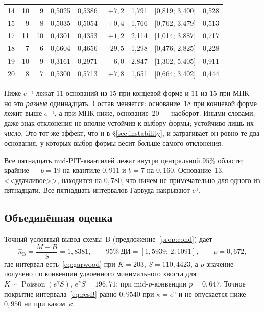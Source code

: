 \documentclass[11pt,a4paper]{article}
\theoremstyle{plain}
\theoremstyle{remark}
\newcommand{\eg}{e^{\gamma}}
\newcommand{\emg}{e^{-\gamma}}
\DeclareMathOperator{\Pois}{Poisson}
\begin{document}
\begin{table}[t]
\begin{tabular}{rrrrrrrl r}
14 & 10 & 9 & 0{,}5025 & 0{,}5386 & $+7{,}2$ & 1{,}791 & [0{,}819; 3{,}400] & 0{,}528\\
15 & 9 & 8 & 0{,}5035 & 0{,}5054 & $+0{,}4$ & 1{,}766 & [0{,}762; 3{,}479] & 0{,}513\\
17 & 11 & 10 & 0{,}4301 & 0{,}4353 & $+1{,}2$ & 2{,}114 & [1{,}014; 3{,}887] & 0{,}717\\
18 & 7 & 6 & 0{,}6604 & 0{,}4656 & $-29{,}5$ & 1{,}298 & [0{,}476; 2{,}825] & 0{,}228\\
19 & 10 & 9 & 0{,}3161 & 0{,}2971 & $-6{,}0$ & 2{,}847 & [1{,}302; 5{,}405] & 0{,}911\\
20 & 8 & 7 & 0{,}5300 & 0{,}5713 & $+7{,}8$ & 1{,}651 & [0{,}664; 3{,}402] & 0{,}444\\
\bottomrule
\end{tabular}
\end{table}

Ниже $\emg$ лежат $11$ оснований из $15$ при концевой форме и $11$ из $15$ при
МНК --- но это \emph{разные} одиннадцать. Состав меняется: основание~18 при
концевой форме лежит выше $\emg$, а при МНК ниже, основание~20 --- наоборот.
Иными словами, даже знак отклонения не вполне устойчив к выбору формы; устойчиво
лишь их \emph{число}. Это тот же эффект, что и в \S\ref{sec:instability}, и
затрагивает он ровно те два основания, у которых выбор формы весит больше самого
отклонения.

Все пятнадцать mid-PIT-квантилей лежат внутри центральной $95\%$ области; крайние ---
$b=19$ на квантиле $0{,}911$ и $b=7$ на $0{,}160$. Основание~13, <<удачливое>>,
находится на $0{,}780$, что ничем не примечательно для одного из пятнадцати.
Все пятнадцать интервалов Гарвуда накрывают $\eg$.

\subsection{Объединённая оценка}\label{sec:pooled}

Точный условный вывод схемы~B (предложение~\ref{prop:cond}) даёт
\begin{equation}\label{eq:resB}
\hat\kappa_{\mathrm B}=\frac{M-B}{S}=1{,}8381,\qquad
95\%\ \text{ДИ}=[1{,}5939;\,2{,}1091],\qquad p=0{,}672,
\end{equation}
где интервал есть~\eqref{eq:garwood} при $K=203$, $S=110{,}4423$, а $p$-значение
получено по конвенции удвоенного минимального хвоста для
$K\sim\Pois(\eg S)$, $\eg S=196{,}71$; при mid-$p$-конвенции $p=0{,}647$.
Точное покрытие интервала~\eqref{eq:resB} равно $0{,}9540$ при $\kappa=\eg$ и не
опускается ниже $0{,}950$ ни при каком~$\kappa$.
\end{document}
